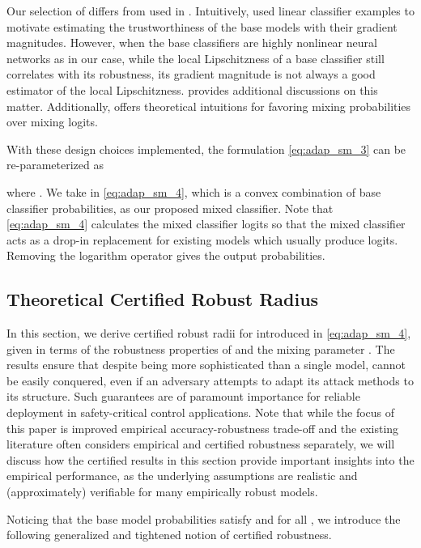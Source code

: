 \documentclass[11pt, letterpaper]{article}
\theoremstyle{plain}
\theoremstyle{definition}
\begin{document}
Our selection of  differs from  used in \citep{Anderson21b}. Intuitively, \citep{Anderson21b} used linear classifier examples to motivate estimating the trustworthiness of the base models with their gradient magnitudes. However, when the base classifiers are highly nonlinear neural networks as in our case, while the local Lipschitzness of a base classifier still correlates with its robustness, its gradient magnitude is not always a good estimator of the local Lipschitzness.  provides additional discussions on this matter. Additionally,  offers theoretical intuitions for favoring mixing probabilities over mixing logits.

With these design choices implemented, the formulation \cref{eq:adap_sm_3} can be re-parameterized as

where . We take  in \cref{eq:adap_sm_4}, which is a convex combination of base classifier probabilities, as our proposed mixed classifier. Note that \cref{eq:adap_sm_4} calculates the mixed classifier logits so that the mixed classifier acts as a drop-in replacement for existing models which usually produce logits. Removing the logarithm operator gives the output probabilities.


\subsection{Theoretical Certified Robust Radius} \label{sec:certified_radius_thms}

In this section, we derive certified robust radii for  introduced in \cref{eq:adap_sm_4}, given in terms of the robustness properties of  and the mixing parameter . The results ensure that despite being more sophisticated than a single model,  cannot be easily conquered, even if an adversary attempts to adapt its attack methods to its structure. Such guarantees are of paramount importance for reliable deployment in safety-critical control applications. Note that while the focus of this paper is improved empirical accuracy-robustness trade-off and the existing literature often considers empirical and certified robustness separately, we will discuss how the certified results in this section provide important insights into the empirical performance, as the underlying assumptions are realistic and (approximately) verifiable for many empirically robust models.

Noticing that the base model probabilities satisfy  and  for all , we introduce the following generalized and tightened notion of certified robustness.
\end{document}
